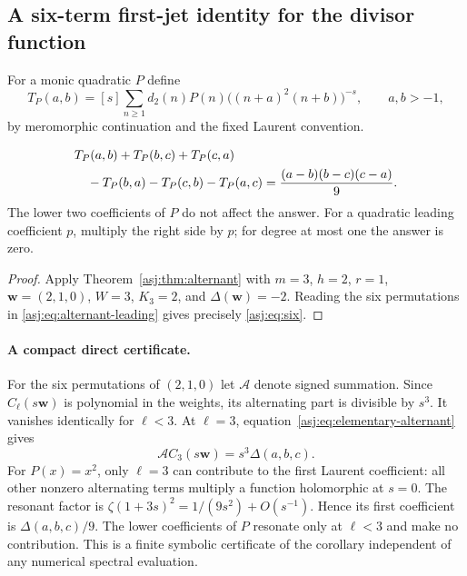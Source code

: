 \subsection{A six-term first-jet identity for the divisor function}
For a monic quadratic $P$ define
\begin{equation}\label{asj:eq:Tdef}
 T_P(a,b)=[s]\sum_{n\ge1}d_2(n)P(n)
                  \bigl((n+a)^2(n+b)\bigr)^{-s},\qquad a,b>-1,
\end{equation}
by meromorphic continuation and the fixed Laurent convention.

\begin{corollary}
\label{asj:thm:six}
\begin{align}\label{asj:eq:six}
 &T_P(a,b)+T_P(b,c)+T_P(c,a)\notag\\
 &\quad-T_P(b,a)-T_P(c,b)-T_P(a,c)
       =\frac{(a-b)(b-c)(c-a)}9.
\end{align}
The lower two coefficients of $P$ do not affect the answer. For a
quadratic leading coefficient $p$, multiply the right side by $p$;
for degree at most one the answer is zero.
\end{corollary}
\begin{proof}
Apply Theorem~\ref{asj:thm:alternant} with $m=3$, $h=2$, $r=1$,
$\boldsymbol w=(2,1,0)$, $W=3$, $K_3=2$, and
$\Delta(\boldsymbol w)=-2$. Reading the six permutations in
\eqref{asj:eq:alternant-leading} gives precisely \eqref{asj:eq:six}.
\end{proof}

\paragraph{A compact direct certificate.}
For the six permutations of $(2,1,0)$ let $\mathcal A$ denote signed
summation. Since $C_\ell(s\boldsymbol w)$ is polynomial in the weights,
its alternating part is divisible by $s^3$. It vanishes identically for
$\ell<3$. At $\ell=3$, equation~\eqref{asj:eq:elementary-alternant} gives
\[
 \mathcal A C_3(s\boldsymbol w)=s^3\Delta(a,b,c).
\]
For $P(x)=x^2$, only $\ell=3$ can contribute to the first Laurent
coefficient: all other nonzero alternating terms multiply a function
holomorphic at $s=0$. The resonant factor is
$\zeta(1+3s)^2=1/(9s^2)+O(s^{-1})$. Hence its first coefficient is
$\Delta(a,b,c)/9$. The lower coefficients of $P$ resonate only at
$\ell<3$ and make no contribution. This is a finite symbolic certificate
of the corollary independent of any numerical spectral evaluation.

